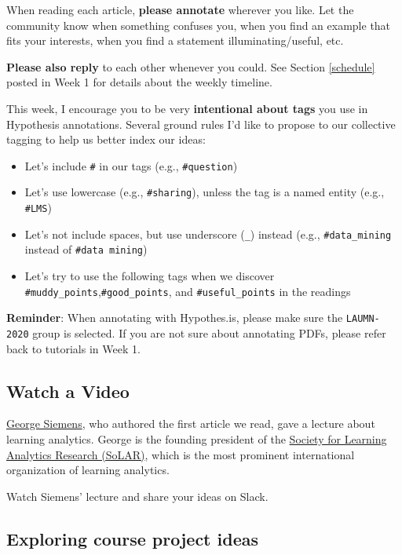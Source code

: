 \documentclass[
]{book}
\providecommand{\tightlist}{%
  \setlength{\itemsep}{0pt}\setlength{\parskip}{0pt}}
\begin{document}
When reading each article, \textbf{please annotate} wherever you like. Let the community know when something confuses you, when you find an example that fits your interests, when you find a statement illuminating/useful, etc.

\textbf{Please also reply} to each other whenever you could. See Section \ref{schedule} posted in Week 1 for details about the weekly timeline.

This week, I encourage you to be very \textbf{intentional about tags} you use in Hypothesis annotations. Several ground rules I'd like to propose to our collective tagging to help us better index our ideas:

\begin{itemize}
\tightlist
\item
  Let's include \texttt{\#} in our tags (e.g., \texttt{\#question})
\item
  Let's use lowercase (e.g., \texttt{\#sharing}), unless the tag is a named entity (e.g., \texttt{\#LMS})
\item
  Let's not include spaces, but use underscore (\texttt{\_}) instead (e.g., \texttt{\#data\_mining} instead of \texttt{\#data\ mining})
\item
  Let's try to use the following tags when we discover \texttt{\#muddy\_points},\texttt{\#good\_points}, and \texttt{\#useful\_points} in the readings
\end{itemize}

\textbf{Reminder}: When annotating with Hypothes.is, please make sure the \texttt{LAUMN-2020} group is selected. If you are not sure about annotating PDFs, please refer back to tutorials in Week 1.

\hypertarget{watch-a-video}{%
\subsection{Watch a Video}\label{watch-a-video}}

\href{https://en.wikipedia.org/wiki/George_Siemens}{George Siemens}, who authored the first article we read, gave a lecture about learning analytics. George is the founding president of the \href{https://solaresearch.org/}{Society for Learning Analytics Research (SoLAR)}, which is the most prominent international organization of learning analytics.

Watch Siemens' lecture and share your ideas on Slack.

\hypertarget{exploring-course-project-ideas}{%
\subsection{Exploring course project ideas}\label{exploring-course-project-ideas}}
\end{document}
